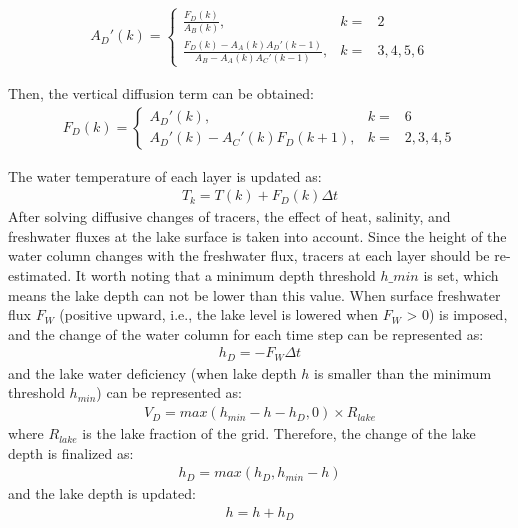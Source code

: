 \begin{eqnarray}
A_{D}'(k)=\left\{\begin{matrix}
\frac{F_{D}(k)}{A_{B}(k)}, &k=&2\\\frac{F_{D}(k)-A_{A}(k)A_{D}'(k-1)}{A_{B}-A_{A}(k)A_{C}'(k-1)}, &k=&3, 4, 5, 6
\end{matrix}\right.
\end{eqnarray}

Then, the vertical diffusion term can be obtained: \begin{eqnarray}
F_{D}(k)=\left\{\begin{matrix}
A_{D}'(k), &k=&6\\A_{D}'(k)-A_{C}'(k)F_{D}(k+1), &k=&2, 3, 4, 5
\end{matrix}\right.
\end{eqnarray}

The water temperature of each layer is updated as: \begin{eqnarray}
T_{k}=T(k)+F_{D}(k)\Delta t
\end{eqnarray} After solving diffusive changes of tracers, the effect of heat, salinity, and freshwater fluxes at the lake surface is taken into account. Since the height of the water column changes with the
freshwater flux, tracers at each layer should be re-estimated. It worth noting that a minimum depth threshold \(h\_{min}\) is set, which means the lake depth can not be lower than this value. When
surface freshwater flux \(F_{W}\) (positive upward, i.e., the lake level is lowered when \(F_{W}\) \textgreater{} 0) is imposed, and the change of the water column for each time step can be
represented as: \begin{eqnarray}
h_{D}=-F_{W}\Delta t
\end{eqnarray} and the lake water deficiency (when lake depth \(h\) is smaller than the minimum threshold \(h_{min}\)) can be represented as: \begin{eqnarray}
V_{D}=max(h_{min}-h-h_{D}, 0)\times R_{lake}
\end{eqnarray} where \(R_{lake}\) is the lake fraction of the grid. Therefore, the change of the lake depth is finalized as: \begin{eqnarray}
h_{D}=max(h_{D}, h_{min}-h)
\end{eqnarray} and the lake depth is updated: \begin{eqnarray}
h=h+h_{D}
\end{eqnarray}


